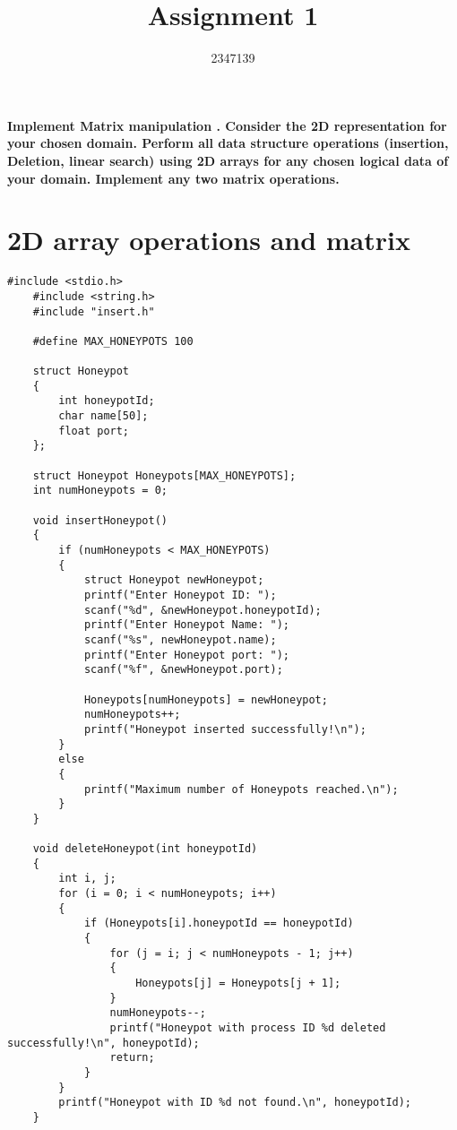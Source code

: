 \documentclass{article}
\author{2347139}
\begin{document}
\title{Assignment 1}
\maketitle

\begin{flushleft}
\large {\textbf{Implement Matrix manipulation .
Consider the 2D representation for your chosen domain. Perform all data structure operations (insertion, Deletion, linear search) using 2D arrays for any chosen logical data of your domain. Implement any two matrix operations.}}
\end{flushleft}
\section*{2D array operations and matrix}
\begin{lstlisting}[style=CStyle]
    #include <stdio.h>
    #include <string.h>
    #include "insert.h"
    
    #define MAX_HONEYPOTS 100
    
    struct Honeypot
    {
        int honeypotId;
        char name[50];
        float port;
    };
    
    struct Honeypot Honeypots[MAX_HONEYPOTS];
    int numHoneypots = 0;
    
    void insertHoneypot()
    {
        if (numHoneypots < MAX_HONEYPOTS)
        {
            struct Honeypot newHoneypot;
            printf("Enter Honeypot ID: ");
            scanf("%d", &newHoneypot.honeypotId);
            printf("Enter Honeypot Name: ");
            scanf("%s", newHoneypot.name);
            printf("Enter Honeypot port: ");
            scanf("%f", &newHoneypot.port);
    
            Honeypots[numHoneypots] = newHoneypot;
            numHoneypots++;
            printf("Honeypot inserted successfully!\n");
        }
        else
        {
            printf("Maximum number of Honeypots reached.\n");
        }
    }
    
    void deleteHoneypot(int honeypotId)
    {
        int i, j;
        for (i = 0; i < numHoneypots; i++)
        {
            if (Honeypots[i].honeypotId == honeypotId)
            {
                for (j = i; j < numHoneypots - 1; j++)
                {
                    Honeypots[j] = Honeypots[j + 1];
                }
                numHoneypots--;
                printf("Honeypot with process ID %d deleted successfully!\n", honeypotId);
                return;
            }
        }
        printf("Honeypot with ID %d not found.\n", honeypotId);
    }
    

\end{lstlisting}
\end{document}
